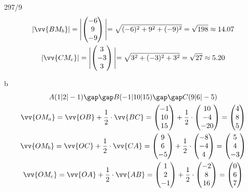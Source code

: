 \begin{exercise}{297/9}
\begin{gather*}
    |\vv{BM_b}| = \Biggl|\begin{pmatrix}-6 \\ 9 \\ -9\end{pmatrix}\Biggl| = \sqrt{(-6)^2 + 9^2 + (-9)^2} = \sqrt{198} \approx 14.07 \\
    |\vv{CM_c}| = \Biggl|\begin{pmatrix}3 \\ -3 \\ 3\end{pmatrix}\Biggl| = \sqrt{3^2 + (-3)^2 + 3^2} = \sqrt{27} \approx 5.20
  \end{gather*}
  \item [b]
  \begin{gather*}
    A(1|2|-1) \gap\gap B(-1|10|15) \gap\gap C(9|6|-5) \\
    \vv{OM_a} = \vv{OB} + \frac{1}{2} \cdot \vv{BC} = \begin{pmatrix}-1 \\ 10 \\ 15\end{pmatrix} + \frac{1}{2} \cdot \begin{pmatrix}10 \\ -4 \\ -20\end{pmatrix} = \begin{pmatrix}4 \\ 8 \\ 5\end{pmatrix} \\
    \vv{OM_b} = \vv{OC} + \frac{1}{2} \cdot \vv{CA} = \begin{pmatrix}9 \\ 6 \\ -5\end{pmatrix} + \frac{1}{2} \cdot \begin{pmatrix}-8 \\ -4 \\ 4\end{pmatrix} = \begin{pmatrix}5 \\ 4 \\ -3\end{pmatrix} \\
    \vv{OM_c} = \vv{OA} + \frac{1}{2} \cdot \vv{AB} = \begin{pmatrix}1 \\ 2 \\ -1\end{pmatrix} + \frac{1}{2} \cdot \begin{pmatrix}-2 \\ 8 \\ 16\end{pmatrix} = \begin{pmatrix}0 \\ 6 \\ 7\end{pmatrix} \\

\end{gather*}
\end{exercise}
